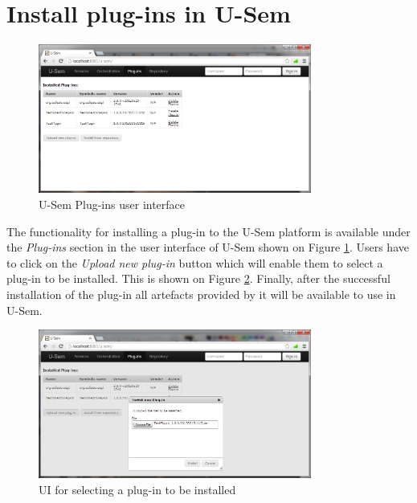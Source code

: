 \documentclass[a4paper, notitlepage]{article}
\begin{document}
\section{Install plug-ins in U-Sem}

\begin{figure}
  \centering
    \includegraphics[width=0.8\textwidth]{plugin-list.png}
    \caption{U-Sem Plug-ins user interface}
    \label{plugin-list}
\end{figure}

The functionality for installing a plug-in to the U-Sem platform is available under the \textit{Plug-ins} section in the user interface of U-Sem shown on Figure \ref{plugin-list}. Users have to click on the \textit{Upload new plug-in} button which will enable them to select a plug-in to be installed. This is shown on Figure \ref{plugin-upload}. Finally, after the successful installation of the plug-in all artefacts provided by it will be available to use in U-Sem. 

\begin{figure}
  \centering
    \includegraphics[width=0.8\textwidth]{plugin-upload.png}
    \caption{UI for selecting a plug-in to be installed}
    \label{plugin-upload}
\end{figure}
\end{document}
